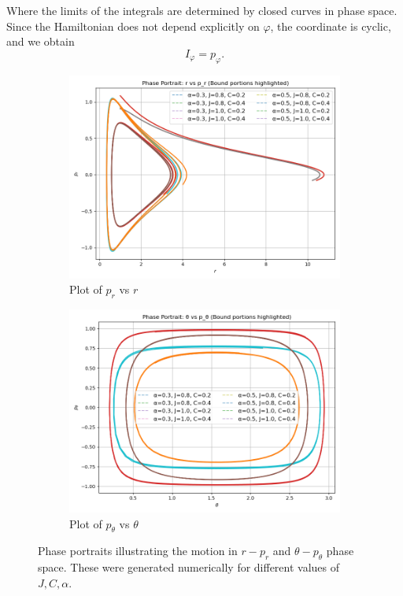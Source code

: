 \documentclass[12pt,oneside]{report}
\theoremstyle{definition}
\begin{document}
 Where the limits of the integrals are determined by closed curves in phase space.
Since the Hamiltonian does not depend explicitly on $\varphi$, the coordinate is cyclic, and we obtain
 $$ I_{\varphi} = p_{\varphi}.$$
 \begin{figure}[ht!]
    \centering
    \begin{subfigure}{0.85\textwidth} %
        \centering
        \includegraphics[width=\linewidth]{figures/p_r plot.png}
        \caption{Plot of \( p_r \) vs \( r \)}
        \label{fig:pr_vs_r}
    \end{subfigure}
    \hfill
    \begin{subfigure}{0.85\textwidth} %
        \centering
        \includegraphics[width=\linewidth]{figures/p_theta plot.png}
        \caption{Plot of \( p_{\theta} \) vs \( \theta \)}
        \label{fig:ptheta_vs_theta}
    \end{subfigure}
    \caption{Phase portraits illustrating the motion in $r-p_{r}$ and $\theta-p_{\theta}$ phase space. These were generated numerically for different values of $J,C,\alpha$. }
    \label{fig:side_by_side}
\end{figure}
\end{document}

